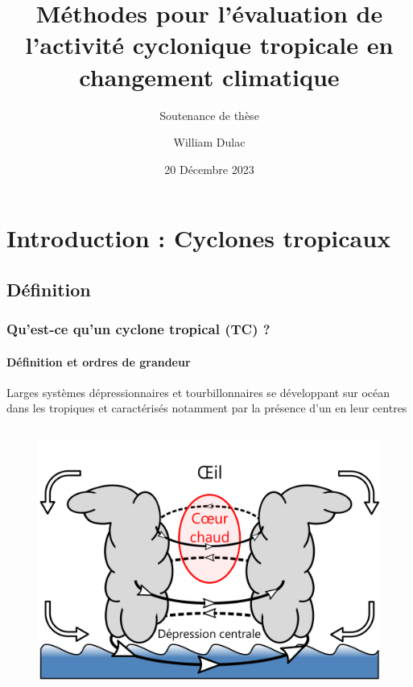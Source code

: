 \documentclass[aspectratio=169, usepdftitle=false, xcolor={dvipsnames}, 9pt,table]{beamer}
\title{Méthodes pour l'évaluation de l'activité cyclonique tropicale en changement climatique}
\author[William]{William Dulac}
\subtitle{Soutenance de thèse}
\institute{Centre National de Recherches Météorologiques}
\date{20 Décembre 2023}
\begin{document}
\maketitle

\section[Introduction]{Introduction : Cyclones tropicaux}

\makesecslide

\subsection{Définition}

\begin{frame}[t]
    \renewcommand*{\thefootnote}{\fnsymbol{footnote}}
    \frametitle{Qu'est-ce qu'un cyclone tropical (TC) ?}
    \framesubtitle{Définition et ordres de grandeur}
    \begin{center}
        \begin{minipage}{0.7\linewidth}
            \begin{definition}
                \footnotesize
                \centering
                Larges systèmes dépressionnaires et tourbillonnaires se développant sur océan dans les tropiques et caractérisés notamment par la présence d'un
             en leur centres
            \end{definition}
        \end{minipage}
    \end{center}
    \begin{columns}
        \begin{column}{0.5\textwidth}
            \vspace{-3em}
            \begin{figure}
                \centering
                \includegraphics[width=\textwidth]{Figures/schema_cyclone.png}

\end{figure}
\end{column}
\end{columns}
\end{frame}
\end{document}
